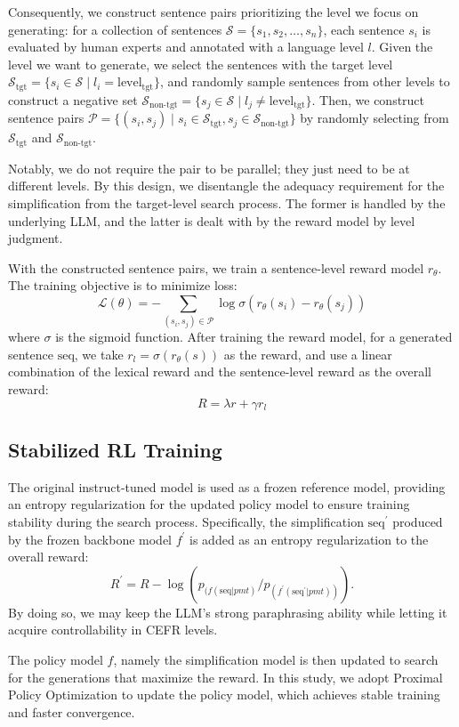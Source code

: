 Consequently, we construct sentence pairs prioritizing the level we focus on generating: for a collection of sentences $\mathcal{S} = \{s_1, s_2, \ldots, s_n\}$, each sentence $s_i$ is evaluated by human experts and annotated with a language level $l$. Given the level we want to generate, we select the sentences with the target level $\mathcal{S}_{\text{tgt}} = \{ s_i \in \mathcal{S} \mid l_i = \text{level}_{\text{tgt}} \}$, and randomly sample sentences from other levels to construct a negative set $\mathcal{S}_{\text{non-tgt}} = \{ s_j \in \mathcal{S} \mid l_j \neq \text{level}_{\text{tgt}} \}$. Then, we construct sentence pairs $\mathcal{P} = \{ (s_i, s_j) \mid s_i \in \mathcal{S}_{\text{tgt}}, s_j \in \mathcal{S}_{\text{non-tgt}} \}$ by randomly selecting from $\mathcal{S}_{\text{tgt}}$ and $\mathcal{S}_{\text{non-tgt}}$. 

Notably, we do not require the pair to be parallel; they just need to be at different levels. %
By this design, we disentangle the adequacy requirement for the simplification from the target-level search process. 
The former is handled by the underlying LLM, and the latter is dealt with by the reward model by level judgment.

With the constructed sentence pairs, we train a sentence-level reward model $r_\theta$. The training objective is to minimize loss: 
\begin{equation}
    \mathcal{L}(\theta) = - \sum_{(s_i, s_j) \in \mathcal{P}} \log \sigma(r_\theta(s_i) - r_\theta(s_j))
\end{equation}
where $\sigma$ is the sigmoid function. 
After training the reward model, for a generated sentence $\text{seq}$, we take $r_l = \sigma(r_\theta(s))$ as the reward, and use a linear combination of the lexical reward and the sentence-level reward as the overall reward: 
\begin{equation}
    R = \lambda r + \gamma r_l
\end{equation}


\subsection{Stabilized RL Training}
The original instruct-tuned model is used as a frozen reference model, providing an entropy regularization for the updated policy model to ensure training stability during the search process. 
Specifically, the simplification $\text{seq}^\prime$ produced by the 
frozen backbone model
$f^\prime$ is added as an entropy regularization to the overall reward:
\begin{equation}
    R^\prime = R-\log(p_{(f(\text{seq}|pmt)}/p_{(f^\prime(\text{seq}^\prime|pmt))}).
\end{equation}
By doing so, we may keep the LLM's strong paraphrasing ability while letting it acquire controllability in CEFR levels.   

The policy model $f$, namely the simplification model is then updated to search for the generations that maximize the reward. In this study, we adopt Proximal Policy Optimization \cite{schulman2017proximal} to update the policy model, which achieves stable training and faster convergence.


